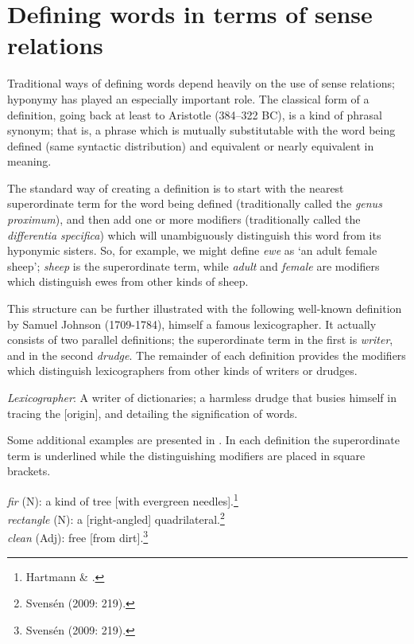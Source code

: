 \section{Defining words in terms of sense relations}\label{sec:} %

Traditional ways of defining words depend heavily on the use of sense relations; hyponymy has played an especially important role. The classical form of a definition, going back at least to Aristotle (384–322 BC), is a kind of phrasal synonym; that is, a phrase which is mutually substitutable with the word being defined (same syntactic distribution) and equivalent or nearly equivalent in meaning.



The standard way of creating a definition is to start with the nearest superordinate term for the word being defined (traditionally called the \textit{genus proximum}), and then add one or more modifiers (traditionally called the \textit{differentia specifica}) which will unambiguously distinguish this word from its hyponymic sisters. So, for example, we might define \textit{ewe} as ‘an adult female sheep’; \textit{sheep} is the superordinate term, while \textit{adult} and \textit{female} are modifiers which distinguish ewes from other kinds of sheep.



This structure can be further illustrated with the following well-known definition by Samuel Johnson (1709-1784), himself a famous lexicographer. It actually consists of two parallel definitions; the superordinate term in the first is \textit{writer}, and in the second \textit{drudge}. The remainder of each definition provides the modifiers which distinguish lexicographers from other kinds of writers or drudges.


\ea \label{ex:6.22}
\textit{Lexicographer}: A writer of dictionaries; a harmless drudge that busies himself in tracing the [origin], and detailing the signification of words.
\z


Some additional examples are presented in . In each definition the superordinate term is underlined while the distinguishing modifiers are placed in square brackets.


\ea \label{ex:6.23}
\ea \textit{fir} (N): a kind of tree [with evergreen needles].\footnote{Hartmann \& \citet[62]{James1998}.}\\
\ex \textit{rectangle} (N): a [right-angled] quadrilateral.\footnote{Svensén (2009: 219).}\\
\ex \textit{clean} (Adj): free [from dirt].\footnote{Svensén (2009: 219).}
                       \z
\z



